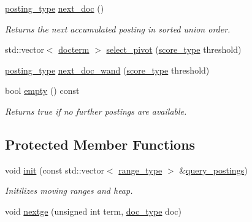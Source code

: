 \begin{DoxyCompactItemize}
\mbox{\hyperlink{classirk_1_1union__range_ac125c83e17d473ee5480fef76cfe42f9}{posting\+\_\+type}} \mbox{\hyperlink{classirk_1_1union__range_a8c5c42595554997abba7ce81c4e8251a}{next\+\_\+doc}} ()
\begin{DoxyCompactList}\small\item\em Returns the next {\itshape accumulated posting} in sorted union order. \end{DoxyCompactList}\item 
std\+::vector$<$ \mbox{\hyperlink{structirk_1_1union__range_1_1docterm}{docterm}} $>$ \mbox{\hyperlink{classirk_1_1union__range_a55d2c36c722c0d865783188eb8e9c584}{select\+\_\+pivot}} (\mbox{\hyperlink{classirk_1_1union__range_af728218b976df464ebb051a9e5358e93}{score\+\_\+type}} threshold)
\item 
\mbox{\hyperlink{classirk_1_1union__range_ac125c83e17d473ee5480fef76cfe42f9}{posting\+\_\+type}} \mbox{\hyperlink{classirk_1_1union__range_a230fb4a5ca924c3d7407baec393c53b7}{next\+\_\+doc\+\_\+wand}} (\mbox{\hyperlink{classirk_1_1union__range_af728218b976df464ebb051a9e5358e93}{score\+\_\+type}} threshold)
\item 
bool \mbox{\hyperlink{classirk_1_1union__range_a661cc5c6767ecd8b468e5b13fb6460f5}{empty}} () const
\begin{DoxyCompactList}\small\item\em Returns true if no further postings are available. \end{DoxyCompactList}\end{DoxyCompactItemize}
\subsection*{Protected Member Functions}
\begin{DoxyCompactItemize}
\item 
void \mbox{\hyperlink{classirk_1_1union__range_a0bd95ecb10bd2f8ee81c5bd23aad3935}{init}} (const std\+::vector$<$ \mbox{\hyperlink{classirk_1_1union__range_aae1621f1e73b1b78990ad11eaa52452b}{range\+\_\+type}} $>$ \&\mbox{\hyperlink{namespaceirk_af66b19416653b16808a23d66c715635a}{query\+\_\+postings}})
\begin{DoxyCompactList}\small\item\em Initilizes moving ranges and heap. \end{DoxyCompactList}\item 
void \mbox{\hyperlink{classirk_1_1union__range_ad195345c32357a6269333a45dd785da8}{nextge}} (unsigned int term, \mbox{\hyperlink{classirk_1_1union__range_aa502a10f2f5c682199072c0ba11a77a9}{doc\+\_\+type}} doc)
\end{DoxyCompactItemize}
